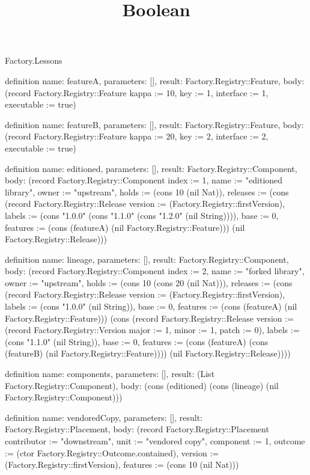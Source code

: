 \begin{lexlean}{Factory.Lessons}
\title{Boolean}
\begin{semanticmodule}
definition{
  name: featureA,
  parameters: [],
  result: Factory.Registry::Feature,
  body: (record Factory.Registry::Feature {kappa := 10, key := 1, interface := 1, executable := true})
}

definition{
  name: featureB,
  parameters: [],
  result: Factory.Registry::Feature,
  body: (record Factory.Registry::Feature {kappa := 20, key := 2, interface := 2, executable := true})
}

definition{
  name: editioned,
  parameters: [],
  result: Factory.Registry::Component,
  body: (record Factory.Registry::Component {index := 1, name := "editioned library", owner := "upstream", holds := (cons 10 (nil Nat)), releases := (cons (record Factory.Registry::Release {version := (Factory.Registry::firstVersion), labels := (cons "1.0.0" (cons "1.1.0" (cons "1.2.0" (nil String)))), base := 0, features := (cons (featureA) (nil Factory.Registry::Feature))}) (nil Factory.Registry::Release))})
}

definition{
  name: lineage,
  parameters: [],
  result: Factory.Registry::Component,
  body: (record Factory.Registry::Component {index := 2, name := "forked library", owner := "upstream", holds := (cons 10 (cons 20 (nil Nat))), releases := (cons (record Factory.Registry::Release {version := (Factory.Registry::firstVersion), labels := (cons "1.0.0" (nil String)), base := 0, features := (cons (featureA) (nil Factory.Registry::Feature))}) (cons (record Factory.Registry::Release {version := (record Factory.Registry::Version {major := 1, minor := 1, patch := 0}), labels := (cons "1.1.0" (nil String)), base := 0, features := (cons (featureA) (cons (featureB) (nil Factory.Registry::Feature)))}) (nil Factory.Registry::Release)))})
}

definition{
  name: components,
  parameters: [],
  result: (List Factory.Registry::Component),
  body: (cons (editioned) (cons (lineage) (nil Factory.Registry::Component)))
}

definition{
  name: vendoredCopy,
  parameters: [],
  result: Factory.Registry::Placement,
  body: (record Factory.Registry::Placement {contributor := "downstream", unit := "vendored copy", component := 1, outcome := (ctor Factory.Registry::Outcome.contained), version := (Factory.Registry::firstVersion), features := (cons 10 (nil Nat))})
}


\end{semanticmodule}
\end{lexlean}
